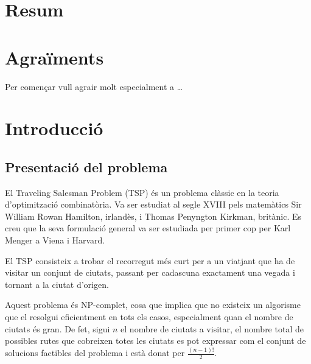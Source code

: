 \documentclass[a4paper,12pt,twoside]{ThesisStyle}
\begin{document}
\titlepage




\chapter*{Resum}



\chapter*{Agraïments}

Per començar vull agrair molt especialment a \ldots


\tableofcontents

\listoffigures

\listoftables

\mainmatter


\chapter{Introducció}
\label{cap:intro}

\section{Presentació del problema}
\label{PresentacioProblema}

El Traveling Salesman Problem (TSP) és un problema clàssic en la teoria d'optimització combinatòria.  
Va ser estudiat al segle XVIII pels matemàtics Sir William Rowan Hamilton, irlandès, i Thomas Penyngton Kirkman, britànic. Es creu que la seva formulació general va ser estudiada per primer cop per Karl Menger a Viena i Harvard.

\medskip

El TSP consisteix a trobar el recorregut més curt per a un viatjant que ha de visitar un conjunt de ciutats, passant per cadascuna exactament una vegada i tornant a la ciutat d'origen.

\medskip

Aquest problema és NP-complet, cosa que implica que no existeix un algorisme que el resolgui eficientment en tots els casos, especialment quan el nombre de ciutats és gran. De fet, sigui \( n \) el nombre de ciutats a visitar, el nombre total de possibles rutes que cobreixen totes les ciutats es pot expressar com el conjunt de solucions factibles del problema i està donat per \( \frac{(n-1)!}{2} \).
\end{document}
